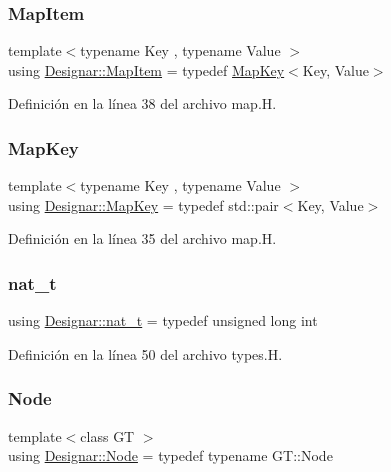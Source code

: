 \subsubsection{\texorpdfstring{Map\+Item}{MapItem}}
{\footnotesize\ttfamily template$<$typename Key , typename Value $>$ \\
using \hyperlink{namespace_designar_abc6ea5602461a15100a645d1f0e5cbcb}{Designar\+::\+Map\+Item} = typedef \hyperlink{namespace_designar_a7394b1b25278abf7211e77b91eb5204f}{Map\+Key}$<$Key, Value$>$}



Definición en la línea 38 del archivo map.\+H.

\mbox{\label{namespace_designar_a7394b1b25278abf7211e77b91eb5204f}} 
\subsubsection{\texorpdfstring{Map\+Key}{MapKey}}
{\footnotesize\ttfamily template$<$typename Key , typename Value $>$ \\
using \hyperlink{namespace_designar_a7394b1b25278abf7211e77b91eb5204f}{Designar\+::\+Map\+Key} = typedef std\+::pair$<$Key, Value$>$}



Definición en la línea 35 del archivo map.\+H.

\mbox{\label{namespace_designar_aa72662848b9f4815e7bf31a7cf3e33d1}} 
\subsubsection{\texorpdfstring{nat\+\_\+t}{nat\_t}}
{\footnotesize\ttfamily using \hyperlink{namespace_designar_aa72662848b9f4815e7bf31a7cf3e33d1}{Designar\+::nat\+\_\+t} = typedef unsigned long int}



Definición en la línea 50 del archivo types.\+H.

\mbox{\label{namespace_designar_a5af326c65aa2bd26b26c410f2030d09e}} 
\subsubsection{\texorpdfstring{Node}{Node}}
{\footnotesize\ttfamily template$<$class GT $>$ \\
using \hyperlink{namespace_designar_a5af326c65aa2bd26b26c410f2030d09e}{Designar\+::\+Node} = typedef typename G\+T\+::\+Node}



